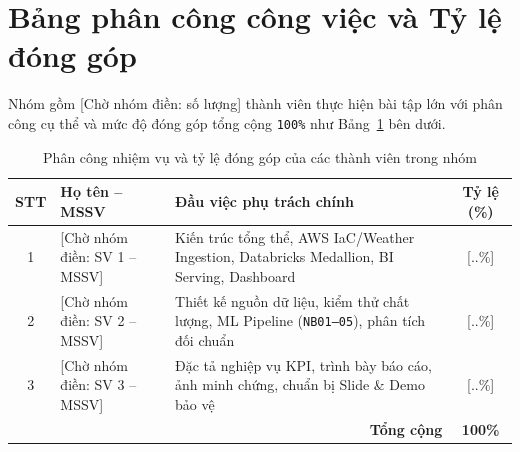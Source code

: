 \chapter*{Bảng phân công công việc và Tỷ lệ đóng góp}

Nhóm gồm [Chờ nhóm điền: số lượng] thành viên thực hiện bài tập lớn với phân công cụ thể và mức độ đóng góp tổng cộng \texttt{100\%} như Bảng~\ref{tab:phancong} bên dưới.

\begin{table}[H]
\centering
\caption{Phân công nhiệm vụ và tỷ lệ đóng góp của các thành viên trong nhóm}
\label{tab:phancong}
\renewcommand{\arraystretch}{1.25}
\begin{tabularx}{\textwidth}{|c|p{}|X|c|}
\hline
\textbf{STT} & \textbf{Họ tên -- MSSV} & \textbf{Đầu việc phụ trách chính} & \textbf{Tỷ lệ (\%)} \\
\hline
1 & [Chờ nhóm điền: SV 1 -- MSSV] & Kiến trúc tổng thể, AWS IaC/Weather Ingestion, Databricks Medallion, BI Serving, Dashboard & [..\%] \\
\hline
2 & [Chờ nhóm điền: SV 2 -- MSSV] & Thiết kế nguồn dữ liệu, kiểm thử chất lượng, ML Pipeline (\texttt{NB01--05}), phân tích đối chuẩn & [..\%] \\
\hline
3 & [Chờ nhóm điền: SV 3 -- MSSV] & Đặc tả nghiệp vụ KPI, trình bày báo cáo, ảnh minh chứng, chuẩn bị Slide \& Demo bảo vệ & [..\%] \\
\hline
\multicolumn{3}{|r|}{\textbf{Tổng cộng}} & \textbf{100\%} \\
\hline
\end{tabularx}
\end{table}
